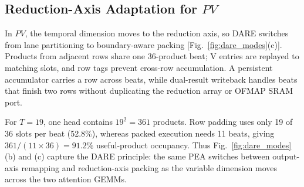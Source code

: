 \subsection{Reduction-Axis Adaptation for $PV$}
In $PV$, the temporal dimension moves to the reduction axis, so DARE switches from lane partitioning to boundary-aware packing [Fig.~\ref{fig:dare_modes}(c)]. Products from adjacent rows share one 36-product beat; V entries are replayed to matching slots, and row tags prevent cross-row accumulation. A persistent accumulator carries a row across beats, while dual-result writeback handles beats that finish two rows without duplicating the reduction array or OFMAP SRAM port.

For $T=19$, one head contains $19^2=361$ products. Row padding uses only 19 of 36 slots per beat (52.8\%), whereas packed execution needs 11 beats, giving $361/(11\times36)=91.2\%$ useful-product occupancy. Thus Fig.~\ref{fig:dare_modes}(b) and (c) capture the DARE principle: the same PEA switches between output-axis remapping and reduction-axis packing as the variable dimension moves across the two attention GEMMs.
